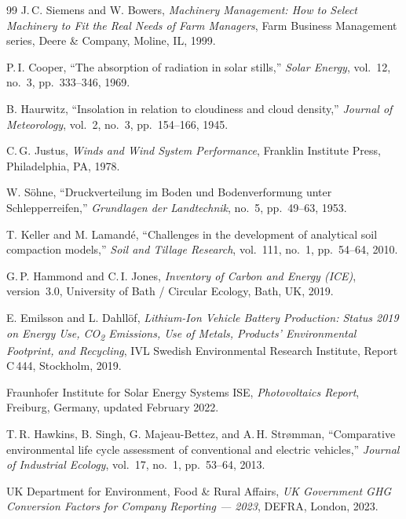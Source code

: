 \documentclass[11pt,a4paper]{article}
\begin{document}
\begin{thebibliography}{99}
J.\,C. Siemens and W. Bowers,
\emph{Machinery Management: How to Select Machinery to Fit the Real Needs of Farm Managers},
Farm Business Management series, Deere \& Company, Moline, IL, 1999.

P.\,I. Cooper,
``The absorption of radiation in solar stills,''
\emph{Solar Energy}, vol.~12, no.~3, pp.~333--346, 1969.

B. Haurwitz,
``Insolation in relation to cloudiness and cloud density,''
\emph{Journal of Meteorology}, vol.~2, no.~3, pp.~154--166, 1945.

C.\,G. Justus,
\emph{Winds and Wind System Performance},
Franklin Institute Press, Philadelphia, PA, 1978.

W. S\"ohne,
``Druckverteilung im Boden und Bodenverformung unter Schlepperreifen,''
\emph{Grundlagen der Landtechnik}, no.~5, pp.~49--63, 1953.

T. Keller and M. Lamand\'e,
``Challenges in the development of analytical soil compaction models,''
\emph{Soil and Tillage Research}, vol.~111, no.~1, pp.~54--64, 2010.

G.\,P. Hammond and C.\,I. Jones,
\emph{Inventory of Carbon and Energy (ICE)}, version~3.0,
University of Bath / Circular Ecology, Bath, UK, 2019.

E. Emilsson and L. Dahll\"of,
\emph{Lithium-Ion Vehicle Battery Production: Status 2019 on Energy Use, CO\textsubscript{2} Emissions, Use of Metals, Products' Environmental Footprint, and Recycling},
IVL Swedish Environmental Research Institute, Report C\,444, Stockholm, 2019.

Fraunhofer Institute for Solar Energy Systems ISE,
\emph{Photovoltaics Report},
Freiburg, Germany, updated February 2022.

T.\,R. Hawkins, B. Singh, G. Majeau-Bettez, and A.\,H. Str{\o}mman,
``Comparative environmental life cycle assessment of conventional and electric vehicles,''
\emph{Journal of Industrial Ecology}, vol.~17, no.~1, pp.~53--64, 2013.

UK Department for Environment, Food \& Rural Affairs,
\emph{UK Government GHG Conversion Factors for Company Reporting --- 2023},
DEFRA, London, 2023.


\end{thebibliography}
\end{document}
